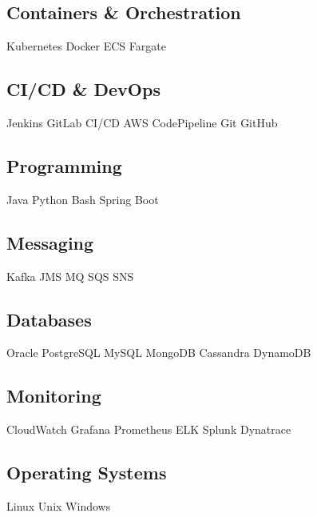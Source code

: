 \documentclass[letterpaper]{deedy-resume} %
\begin{document}
\begin{minipage}[t]{0.33\textwidth}
\sectionspace

\subsection{Containers \& Orchestration}
Kubernetes \textbullet{} Docker \textbullet{} ECS \textbullet{} Fargate

\sectionspace

\subsection{CI/CD \& DevOps}
Jenkins \textbullet{} GitLab CI/CD \textbullet{} AWS CodePipeline \textbullet{} Git \textbullet{} GitHub

\sectionspace

\subsection{Programming}
Java \textbullet{} Python \textbullet{} Bash \textbullet{} Spring Boot

\sectionspace

\subsection{Messaging}
Kafka \textbullet{} JMS \textbullet{} MQ \textbullet{} SQS \textbullet{} SNS

\sectionspace

\subsection{Databases}
Oracle \textbullet{} PostgreSQL \textbullet{} MySQL \textbullet{} MongoDB \textbullet{} Cassandra \textbullet{} DynamoDB

\sectionspace

\subsection{Monitoring}
CloudWatch \textbullet{} Grafana \textbullet{} Prometheus \textbullet{} ELK \textbullet{} Splunk \textbullet{} Dynatrace

\sectionspace

\subsection{Operating Systems}
Linux \textbullet{} Unix \textbullet{} Windows



\end{minipage}
\end{document}
